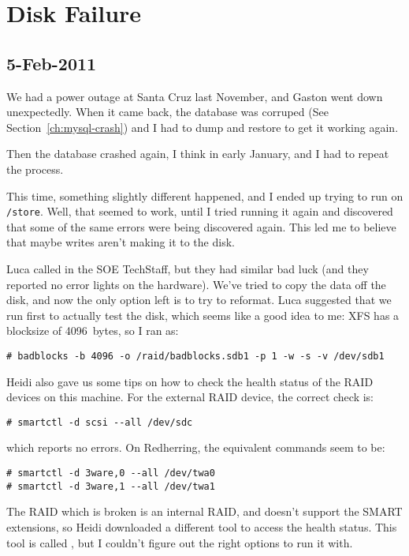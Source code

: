 \section{Disk Failure}

\subsection{5-Feb-2011}

We had a power outage at Santa Cruz last November, and Gaston
went down unexpectedly.
When it came back, the database was corruped
(See Section~\ref{ch:mysql-crash}) and I had to dump and restore
to get it working again.

Then the database crashed again, I think in early January,
and I had to repeat the process.

This time, something slightly different happened, and I ended up
trying to run  on \texttt{/store}.
Well, that seemed to work, until I tried running it again and
discovered that some of the same errors were being discovered again.
This led me to believe that maybe writes aren't making it to the
disk.

Luca called in the SOE TechStaff, but they had similar bad luck
(and they reported no error lights on the hardware).
We've tried to copy the data off the disk, and now the only option
left is to try to reformat.
Luca suggested that we run  first to actually
test the disk, which seems like a good idea to me:
XFS has a blocksize of 4096~bytes, so I ran  as:
\begin{verbatim}
# badblocks -b 4096 -o /raid/badblocks.sdb1 -p 1 -w -s -v /dev/sdb1
\end{verbatim}

Heidi also gave us some tips on how to check the health status
of the RAID devices on this machine.
For the external RAID device, the correct check is:
\begin{verbatim}
# smartctl -d scsi --all /dev/sdc
\end{verbatim}
which reports no errors.
On Redherring, the equivalent commands seem to be:
\begin{verbatim}
# smartctl -d 3ware,0 --all /dev/twa0
# smartctl -d 3ware,1 --all /dev/twa1
\end{verbatim}

The RAID which is broken is an internal RAID, and doesn't support
the SMART extensions, so Heidi downloaded a different tool to
access the health status.  This tool is called ,
but I couldn't figure out the right options to run it with.

